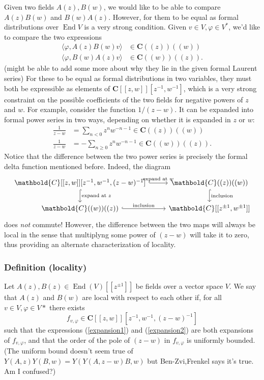 \documentclass{article}
\newcommand{\CC}{\mathbold{C}}
\DeclareMathOperator{\End}{End}
\begin{document}
Given two fields $A(z),B(w)$, we would like to be able to compare $A(z)B(w)$ and $B(w)A(z)$.  However, for them to be equal as formal distributions over $\End V$ is a very strong condition.  Given $v \in V, \varphi \in V^*$, we'd like to compare the two expressions
\begin{align}
  \langle \varphi, A(z)B(w) v \rangle &\in \CC((z))((w)) \label{expansion1}\\
  \langle \varphi, B(w)A(z) v \rangle &\in \CC((w))((z)). \label{expansion2}
\end{align}
(might be able to add some more about why they lie in the given formal Laurent series)
For these to be equal as formal distributions in two variables, they must both be expressible as elements of $\CC[[z,w]][z^{-1},w^{-1}]$, which is a very strong constraint on the possible coefficients of the two fields for negative powers of $z$ and $w$.  For example, consider the function $1/(z-w)$.  It can be expanded into formal power series in two ways, depending on whether it is expanded in $z$ or $w$:
\begin{align}
  \frac{1}{z-w}&=\sum_{n<0}z^nw^{-n-1} \in \CC((z))((w))\\
  \frac{1}{z-w}&=-\sum_{n \ge 0}z^nw^{-n-1} \in \CC((w))((z)).
\end{align}
Notice that the difference between the two power series is precisely the formal delta function mentioned before.  Indeed, the diagram
\[
  \begin{tikzcd}
    \CC[[z,w]][z^{-1},w^{-1},(z-w)^{-1}] \arrow[r,hook,"\textrm{expand at }w"] \arrow[d,hook,"\textrm{expand at }z"] & \CC((z))((w)) \arrow[d,hook,"\textrm{inclusion}"]\\
    \CC((w))((z))\arrow[r,hook,"\textrm{inclusion}"]& \CC[[z^{\pm 1},w^{\pm 1}]]
  \end{tikzcd}
\]
does \textit{not} commute!  However, the difference between the two maps will always be local in the sense that multiplyng some power of $(z-w)$ will take it to zero, thus providing an alternate characterization of locality.
\subsubsection{Definition (locality)}
Let $A(z),B(z) \in \End (V)[[z^{\pm 1}]]$ be fields over a vector space $V$.  We say that $A(z)$ and $B(w)$ are local with respect to each other if, for all $v \in V, \varphi \in V*$ there exists
\[f_{v,\varphi} \in \CC[[z,w]][z^{-1},w^{-1},(z-w)^{-1}] \]
such that the expressions (\ref{expansion1}) and (\ref{expansion2}) are both expansions of $f_{v,\varphi}$, and that the order of the pole of $(z-w)$ in $f_{v,\varphi}$ is uniformly bounded. (The uniform bound doesn't seem true of $Y(A,z)Y(B,w)=Y(Y(A,z-w)B,w)$ but Ben-Zvi,Frenkel says it's true.  Am I confused?)
\end{document}
